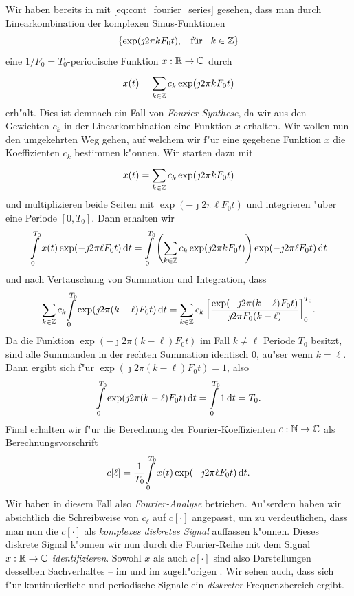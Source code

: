 Wir haben bereits in  mit \eqref{eq:cont_fourier_series} gesehen, dass man durch Linearkombination der komplexen Sinus-Funktionen
\[
\{\exp(\jmath 2 \pi k F_0 t), {\hspace{3mm} \text{f\"ur} \hspace{3mm}} k \in \mathbb{Z}\}
\]
eine $1/F_0=T_0$-periodische Funktion $x: \mathbb{R} \rightarrow \mathbb{C}$ durch
\[
x(t) = {\sum\limits_{k \in \mathbb{Z}}^{}{c_k \exp(\jmath 2 \pi k F_0 t)}}
\]
erh"alt.
Dies ist demnach ein Fall von \emph{Fourier-Synthese}, da wir aus den Gewichten $c_k$ in der Linearkombination eine Funktion $x$ erhalten.
Wir wollen nun den umgekehrten Weg gehen, auf welchem wir f"ur eine gegebene Funktion $x$ die Koeffizienten $c_k$ bestimmen k"onnen.
Wir starten dazu mit 
\begin{equation}\label{eq:fourier:fourier_series}
    x(t) = {\sum\limits_{k \in \mathbb{Z}}^{}{
        c_k \exp(\jmath 2 \pi k F_0 t)
    }}
\end{equation}
und multiplizieren beide Seiten mit $\exp(-\jmath 2 \pi \ell F_0 t)$ und integrieren "uber eine Periode $[0,T_0]$.
Dann erhalten wir
\[
{\int\limits_{0}^{T_0}{
    x(t) \exp(-\jmath 2 \pi \ell F_0 t)
}\,\mathrm{d}{t}} 
= {\int\limits_{0}^{T_0}{
    \left(
        {\sum\limits_{k \in \mathbb{Z}}^{}{
            c_k \exp(\jmath 2 \pi k F_0 t)
        }}
    \right)
    \exp(-\jmath 2 \pi \ell F_0 t)
}\,\mathrm{d}{t}} 
\]
und nach Vertauschung von Summation und Integration, dass
\[
{\sum\limits_{k \in \mathbb{Z}}^{}{
    c_k 
    {\int\limits_{0}^{T_0}{\exp(\jmath 2 \pi (k - \ell) F_0 t)}\,\mathrm{d}{t}}
}}
= {\sum\limits_{k \in \mathbb{Z}}^{}{
    c_k \left[
        \frac{
            \exp(-\jmath 2 \pi (k - \ell) F_0 t)
        }{
            \jmath 2 \pi F_0(k - \ell)
        }
    \right]_{0}^{T_0}
}}.
\]
Da die Funktion $\exp(-\jmath 2 \pi (k - \ell) F_0 t)$ im Fall $k \neq  \ell$ Periode $T_0$ besitzt, sind alle Summanden in der rechten Summation identisch $0$, au"ser wenn $k = \ell$.
Dann ergibt sich f"ur $\exp(\jmath 2 \pi (k - \ell) F_0 t) = 1$, also
\[
{\int\limits_{0}^{T_0}{\exp(\jmath 2 \pi (k - \ell) F_0 t)}\,\mathrm{d}{t}} 
    = {\int\limits_{0}^{T_0}{1}\,\mathrm{d}{t}} 
    = T_0.
\]
Final erhalten wir f"ur die Berechnung der Fourier-Koeffizienten $c : \mathbb{N} \rightarrow \mathbb{C}$ als Berechnungsvorschrift
\[
    c[\ell] = \frac{1}{T_0}{\int\limits_{0}^{T_0}{
        x(t) \exp(-\jmath 2 \pi \ell F_0 t)
    }\,\mathrm{d}{t}}.
\]
Wir haben in diesem Fall also \emph{Fourier-Analyse} betrieben.
Au"serdem haben wir absichtlich die Schreibweise von $c_\ell$ auf $c[\cdot]$ angepasst, um zu verdeutlichen, dass man nun die $c[\cdot]$ als \emph{komplexes diskretes Signal} auffassen k"onnen.
Dieses diskrete Signal k"onnen wir nun durch die Fourier-Reihe mit dem Signal $x : \mathbb{R} \rightarrow \mathbb{C}$ \emph{identifizieren}.
Sowohl $x$ als auch $c[\cdot]$ sind also Darstellungen desselben Sachverhaltes -- im  und im zugeh"origen .
Wir sehen auch, dass sich f"ur kontinuierliche und periodische Signale ein \emph{diskreter} Frequenzbereich ergibt.

